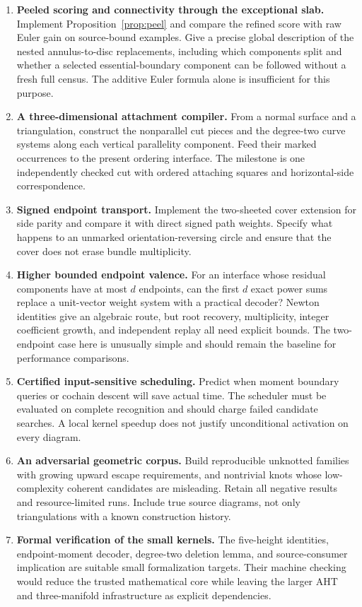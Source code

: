 \documentclass[11pt,letterpaper]{article}
\theoremstyle{definition}
\theoremstyle{remark}
\begin{document}
\begin{enumerate}[label=\textbf{Q\arabic*.},leftmargin=*]
\item \textbf{Peeled scoring and connectivity through the exceptional slab.}
Implement Proposition~\ref{prop:peel} and compare the refined score with
raw Euler gain on source-bound examples. Give a precise
global description of the nested annulus-to-disc replacements, including
which components split and whether a selected essential-boundary component
can be followed without a fresh full census. The additive Euler formula
alone is insufficient for this purpose.

\item \textbf{A three-dimensional attachment compiler.} From a normal
surface and a triangulation, construct the nonparallel cut pieces and the
degree-two curve systems along each vertical parallelity component. Feed
their marked occurrences to the present ordering interface. The milestone
is one independently checked cut with ordered attaching squares and
horizontal-side correspondence.

\item \textbf{Signed endpoint transport.} Implement the two-sheeted cover
extension for side parity and compare it with direct signed path weights.
Specify what happens to an unmarked orientation-reversing circle and ensure
that the cover does not erase bundle multiplicity.

\item \textbf{Higher bounded endpoint valence.} For an interface whose
residual components have at most $d$ endpoints, can the first $d$ exact
power sums replace a unit-vector weight system with a practical decoder?
Newton identities give an algebraic route, but root recovery, multiplicity,
integer coefficient growth, and independent replay all need explicit bounds.
The two-endpoint case here is unusually simple and should remain the
baseline for performance comparisons.

\item \textbf{Certified input-sensitive scheduling.} Predict when moment
boundary queries or cochain descent will save actual time. The scheduler
must be evaluated on complete recognition and should charge failed
candidate searches. A local kernel speedup does not justify unconditional
activation on every diagram.

\item \textbf{An adversarial geometric corpus.} Build reproducible unknotted
families with growing upward escape requirements, and nontrivial knots
whose low-complexity coherent candidates are misleading. Retain all
negative results and resource-limited runs. Include true source diagrams,
not only triangulations with a known construction history.

\item \textbf{Formal verification of the small kernels.} The five-height
identities, endpoint-moment decoder, degree-two deletion lemma, and
source-consumer implication are suitable small formalization targets.
Their machine checking would reduce the trusted mathematical core while
leaving the larger AHT and three-manifold infrastructure as explicit
dependencies.
\end{enumerate}
\end{document}
